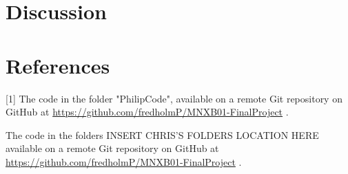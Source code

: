 \documentclass[a4, 12pt]{article}
\begin{document}






\section{Discussion}

\newpage
\section{References}
[1] The code in the folder "PhilipCode", available on a remote Git repository on GitHub at \href{https://github.com/fredholmP/MNXB01-FinalProject}{https://github.com/fredholmP/MNXB01-FinalProject} . \newline

\noindent [2] The code in the folders INSERT CHRIS'S FOLDERS LOCATION HERE available on a remote Git repository on GitHub at \href{https://github.com/fredholmP/MNXB01-FinalProject}{https://github.com/fredholmP/MNXB01-FinalProject} . \newline
\end{document}
